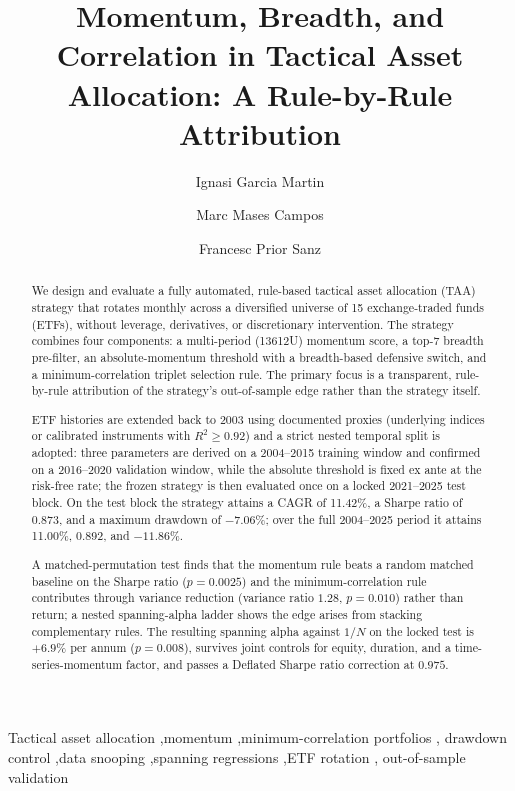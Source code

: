 \documentclass[review,12pt]{elsarticle}
\begin{document}
\begin{frontmatter}

\title{Momentum, Breadth, and Correlation in Tactical Asset
Allocation: A Rule-by-Rule Attribution}

\author[iqs]{Ignasi Garcia Martin}
\author[iqs]{Marc Mases Campos}
\author[iqs]{Francesc Prior Sanz}


\begin{abstract}
We design and evaluate a fully automated, rule-based tactical asset allocation
(TAA) strategy that rotates monthly across a diversified universe of 15
exchange-traded funds (ETFs), without leverage, derivatives, or discretionary
intervention.
The strategy combines four components: a multi-period (13612U) momentum score,
a top-$7$ breadth pre-filter, an absolute-momentum threshold with a
breadth-based defensive switch, and a minimum-correlation triplet selection rule.
The primary focus is a transparent, rule-by-rule attribution of the strategy's
out-of-sample edge rather than the strategy itself.

ETF histories are extended back to 2003 using documented proxies (underlying
indices or calibrated instruments with $R^2 \geq 0.92$) and a strict nested
temporal split is adopted: three parameters are derived on a 2004--2015 training
window and confirmed on a 2016--2020 validation window, while the absolute
threshold is fixed ex ante at the risk-free rate; the frozen strategy is then
evaluated once on a locked 2021--2025 test block.
On the test block the strategy attains a CAGR of 11.42\%, a Sharpe ratio of
0.873, and a maximum drawdown of $-7.06\%$; over the full 2004--2025 period it
attains 11.00\%, 0.892, and $-11.86\%$.

A matched-permutation test finds that the momentum rule beats a random matched
baseline on the Sharpe ratio ($p = 0.0025$) and the minimum-correlation rule
contributes through variance reduction (variance ratio $1.28$, $p = 0.010$)
rather than return; a nested spanning-alpha ladder shows the edge arises from
stacking complementary rules.
The resulting spanning alpha against $1/N$ on the locked test is $+6.9\%$ per
annum ($p = 0.008$), survives joint controls for equity, duration, and a
time-series-momentum factor, and passes a Deflated Sharpe ratio correction at
$0.975$.
\end{abstract}

\begin{keyword}
Tactical asset allocation \sep momentum \sep minimum-correlation portfolios \sep
drawdown control \sep data snooping \sep spanning regressions \sep ETF rotation \sep
out-of-sample validation
\end{keyword}

\end{frontmatter}
\end{document}

